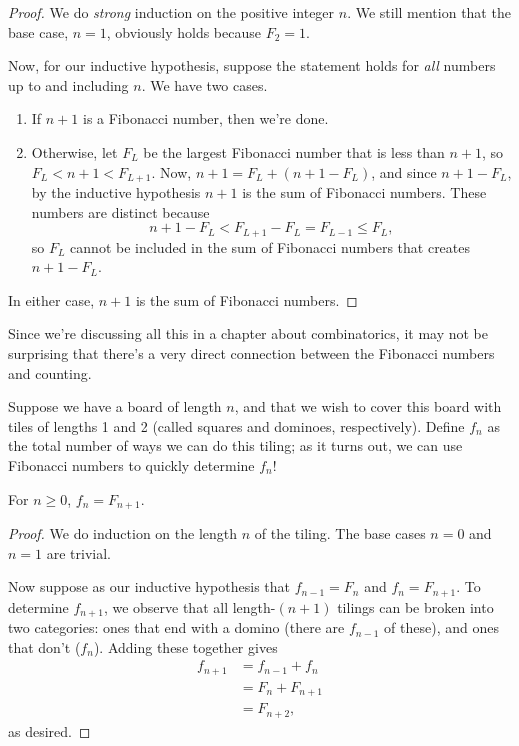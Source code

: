 \documentclass[../m055main.tex]{subfiles}
\begin{document}
\begin{proof}
    We do \textit{strong} induction on the positive integer $n$.
    We still mention that the base case, $n=1$, obviously holds because $F_2 = 1$.

    Now, for our inductive hypothesis, suppose the statement holds for \textit{all} numbers up to and including $n$.
    We have two cases.
    \begin{enumerate}[label=(\alph*)]
        \item If $n+1$ is a Fibonacci number, then we're done.
        \item Otherwise, let $F_L$ be the largest Fibonacci number that is less than $n+1$, so $F_L < n+1 < F_{L+1}$.
        Now, $n+1 = F_L + (n+1 - F_L)$, and since $n + 1 - F_L$, by the inductive hypothesis $n+1$ is the sum of Fibonacci numbers.
        These numbers are distinct because
        \[ n+1 - F_L < F_{L+1} - F_L = F_{L-1} \leq F_L, \]
        so $F_L$ cannot be included in the sum of Fibonacci numbers that creates $n+1 - F_L$.
    \end{enumerate}
    In either case, $n+1$ is the sum of Fibonacci numbers.
\end{proof}

Since we're discussing all this in a chapter about combinatorics, it may not be surprising that there's a very direct connection between the Fibonacci numbers and counting.

Suppose we have a board of length $n$, and that we wish to cover this board with tiles of lengths 1 and 2 (called squares and dominoes, respectively).
Define $f_n$ as the total number of ways we can do this tiling; as it turns out, we can use Fibonacci numbers to quickly determine $f_n$!

\begin{theorem}
    For $n \geq 0$, $f_n = F_{n+1}$.
\end{theorem}

\begin{proof}
    We do induction on the length $n$ of the tiling.
    The base cases $n=0$ and $n=1$ are trivial.

    Now suppose as our inductive hypothesis that $f_{n-1} = F_n$ and $f_n = F_{n+1}$.
    To determine $f_{n+1}$, we observe that all length-$(n+1)$ tilings can be broken into two categories: ones that end with a domino (there are $f_{n-1}$ of these), and ones that don't ($f_n$).
    Adding these together gives
    \begin{align*}
        f_{n+1} &= f_{n-1} + f_n \\
        &= F_n + F_{n+1} \\
        &= F_{n+2},
    \end{align*}
    as desired.
\end{proof}
\end{document}
